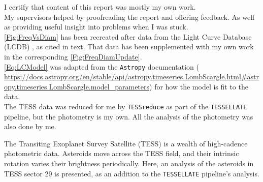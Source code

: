 \documentclass{UCreport}
\begin{document}




\buildmargins %
\buildcover %



\declaration

I certify that content of this report was mostly my own work.
\\

My supervisors helped by proofreading the report and offering feedback. As well as providing useful insight into problems when I was stuck.\\

\autoref{Fig:FreqVsDiam} has been recreated after data from the Light Curve Database (LCDB) \citet{Warner2009}, as cited in text. That data has been supplemented with my own work in the corresponding \autoref{Fig:FreqDiamUpdate}.\\

\autoref{Eq:LCModel} was adapted from the \texttt{Astropy} documentation
\citep{Astropy2022} ( \url{https://docs.astropy.org/en/stable/api/astropy.timeseries.LombScargle.html#astropy.timeseries.LombScargle.model_parameters}) for how the model is fit to the data. \\

The TESS data was reduced for me by \texttt{TESSreduce} as part of the \texttt{TESSELLATE} pipeline, but the photometry is my own.
All the analysis of the photometry was also done by me. 

\vspace{2cm}
\begin{centering}
  \textbf{\student}\par
\end{centering}

\newpage


\abstract

The Transiting Exoplanet Survey Satellite (TESS) is a wealth of high-cadence photometric data. 
Asteroids move across the TESS field, and their intrinsic rotation varies their brightness periodically. 
Here, an analysis of the asteroids in TESS sector 29 is presented, as an addition to the \texttt{TESSELLATE} pipeline's analysis.
\end{document}
